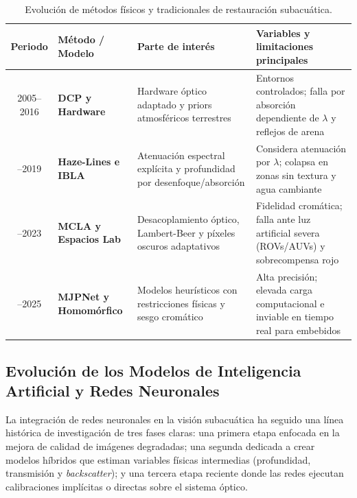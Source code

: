 \documentclass[12pt,letterpaper,spanish,twoside,openright]{report}
\begin{document}
\begin{table}[htbp]
  \centering
  \caption{Evolución de métodos físicos y tradicionales de restauración subacuática.}
  \label{tab:metodos_fisicos_tradicionales}
  \small
  \begin{tabularx}{\textwidth}{c l X X}
    \toprule
    \textbf{Periodo} & \textbf{Método / Modelo} & \textbf{Parte de interés} & \textbf{Variables y limitaciones principales} \\
    \midrule
    2005--2016 & \textbf{DCP y Hardware} & Hardware óptico adaptado y priors atmosféricos terrestres & Entornos controlados; falla por absorción dependiente de $\lambda$ y reflejos de arena \parencite{rs15194699, Ke_2023, 9020130} \\
    \addlinespace
    2017--2019 & \textbf{Haze-Lines e IBLA} & Atenuación espectral explícita y profundidad por desenfoque/absorción & Considera atenuación por $\lambda$; colapsa en zonas sin textura y agua cambiante \parencite{rs15194699, Ke_2023, 9020130} \\
    \addlinespace
    2020--2023 & \textbf{MCLA y Espacios Lab} & Desacoplamiento óptico, Lambert-Beer y píxeles oscuros adaptativos & Fidelidad cromática; falla ante luz artificial severa (ROVs/AUVs) y sobrecompensa rojo \parencite{10216333, rs15194699} \\
    \addlinespace
    2024--2025 & \textbf{MJPNet y Homomórfico} & Modelos heurísticos con restricciones físicas y sesgo cromático & Alta precisión; elevada carga computacional e inviable en tiempo real para embebidos \parencite{10798483, ZHANG2025108826} \\
    \bottomrule
  \end{tabularx}
\end{table}

\subsection*{Evolución de los Modelos de Inteligencia Artificial y Redes Neuronales}

La integración de redes neuronales en la visión subacuática ha seguido una línea histórica de investigación de tres fases claras: una primera etapa enfocada en la mejora de calidad de imágenes degradadas; una segunda dedicada a crear modelos híbridos que estiman variables físicas intermedias (profundidad, transmisión y \textit{backscatter}); y una tercera etapa reciente donde las redes ejecutan calibraciones implícitas o directas sobre el sistema óptico.
\end{document}

